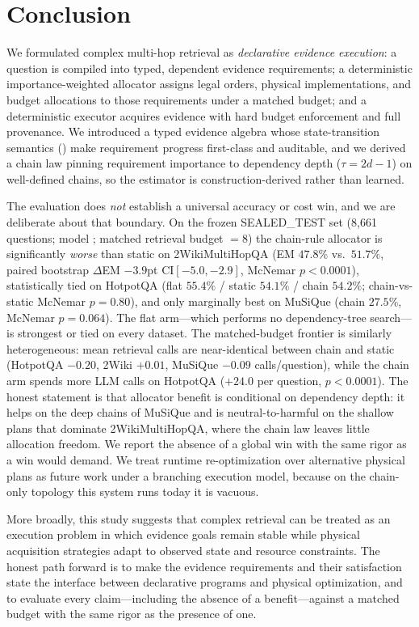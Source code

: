 \section{Conclusion}
\label{sec:conclusion}

We formulated complex multi-hop retrieval as \emph{declarative evidence
execution}: a question is compiled into typed, dependent evidence requirements;
a deterministic importance-weighted allocator assigns legal orders, physical
implementations, and budget allocations to those requirements under a matched
budget; and a deterministic executor acquires evidence with hard budget
enforcement and full provenance. We introduced a typed evidence algebra whose
state-transition semantics () make requirement
progress first-class and auditable, and we derived a chain law pinning
requirement importance to dependency depth ($\tau = 2d-1$) on well-defined
chains, so the estimator is construction-derived rather than learned.

The evaluation does \emph{not} establish a universal accuracy or cost win, and
we are deliberate about that boundary. On the frozen SEALED\_TEST set (8,661
questions; model ; matched retrieval budget $=8$) the
chain-rule allocator is significantly \emph{worse} than static on
2WikiMultiHopQA (EM $47.8\%$ vs.\ $51.7\%$, paired bootstrap $\Delta$EM
$-3.9$pt CI$[-5.0,-2.9]$, McNemar $p<0.0001$), statistically tied on HotpotQA
(flat $55.4\%$ / static $54.1\%$ / chain $54.2\%$; chain-vs-static McNemar
$p{=}0.80$), and only marginally best on MuSiQue (chain $27.5\%$, McNemar
$p{=}0.064$). The flat arm---which performs no dependency-tree search---is
strongest or tied on every dataset. The matched-budget frontier is similarly
heterogeneous: mean retrieval calls are near-identical between chain and static
(HotpotQA $-0.20$, 2Wiki $+0.01$, MuSiQue $-0.09$ calls/question), while the
chain arm spends more LLM calls on HotpotQA ($+24.0$ per question,
$p<0.0001$). The honest statement is that allocator benefit is conditional on
dependency depth: it helps on the deep chains of MuSiQue and is
neutral-to-harmful on the shallow plans that dominate 2WikiMultiHopQA, where
the chain law leaves little allocation freedom. We report the absence of a
global win with the same rigor as a win would demand.
We treat runtime re-optimization over alternative physical plans as future work
under a branching execution model, because on the chain-only topology this
system runs today it is vacuous.

More broadly, this study suggests that complex retrieval can be treated as an
execution problem in which evidence goals remain stable while physical
acquisition strategies adapt to observed state and resource constraints. The
honest path forward is to make the evidence requirements and their satisfaction
state the interface between declarative programs and physical optimization, and
to evaluate every claim---including the absence of a benefit---against a
matched budget with the same rigor as the presence of one.

